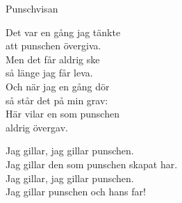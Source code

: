 \begin{song}{Punschvisan}

	
	Det var en gång jag tänkte\\
	att punschen övergiva.\\
	Men det får aldrig ske\\
	så länge jag får leva.\\
	Och när jag en gång dör\\
	så står det på min grav:\\
	Här vilar en som punschen\\
	aldrig övergav.\\
	\begin{repetition}
		Jag gillar, jag gillar punschen.\\
		Jag gillar den som punschen skapat har.\\
		Jag gillar, jag gillar punschen.\\
		Jag gillar punschen och hans far!
	\end{repetition}
	
\end{song}
